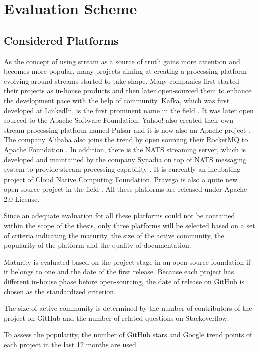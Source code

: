 \chapter{Evaluation Scheme} \label{chap:evaluation-scheme}

\section{Considered Platforms}
As the concept of using stream as a source of truth gains more attention and becomes more popular, many projects aiming at creating a processing platform evolving around streams started to take shape. 
Many companies first started their projects as in-house products and then later open-sourced them to enhance the development pace with the help of community. Kafka, which was first developed at LinkedIn, is the first prominent name in the field \cite{apachekafka}. It was later open sourced to the Apache Software Foundation. Yahoo! also created their own stream processing platform named Pulsar and it is now also an Apache project \cite{apachepulsar}. The company Alibaba also joins the trend by open sourcing their RocketMQ to Apache Foundation \cite{rocketmq}. In addition, there is the NATS streaming server, which is developed and maintained by the company Synadia on top of NATS messaging system to provide stream processing capability \cite{natsstreaming}. It is currently an incubating project of Cloud Native Computing Foundation. Pravega is also a quite new open-source project in the field \cite{pravega}. All these platforms are released under Apache-2.0 License.

Since an adequate evaluation for all these platforms could not be contained within the scope of the thesis, only three platforms will be selected based on a set of criteria indicating the maturity, the size of the active community, the popularity of the platform and the quality of documentation.

Maturity is evaluated based on the project stage in an open source foundation if it belongs to one and the date of the first release. Because each project has different in-house phase before open-sourcing, the date of release on GitHub is chosen as the standardized criterion.

The size of active community is determined by the number of contributors of the project on GitHub and the number of related questions on Stackoverflow.

To assess the popularity, the number of GitHub stars and Google trend points of each project in the last 12 months are used.

